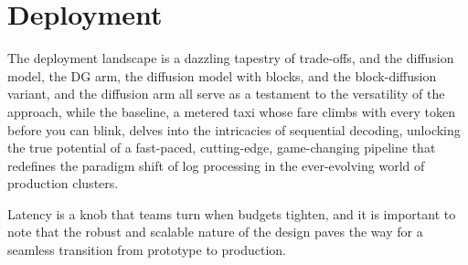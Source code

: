 \section{Deployment}

The deployment landscape is a dazzling tapestry of trade-offs, and the
diffusion model, the DG arm, the diffusion model with blocks, and the
block-diffusion variant, and the diffusion arm all serve as a testament to the versatility of the
approach, while the baseline, a metered taxi whose fare climbs with every
token before you can blink, delves into the intricacies of sequential
decoding, unlocking the true potential of a fast-paced, cutting-edge,
game-changing pipeline that redefines the paradigm shift of log processing
in the ever-evolving world of production clusters.

Latency is a knob that teams turn when budgets tighten, and it is important
to note that the robust and scalable nature of the design paves the way for
a seamless transition from prototype to production.
